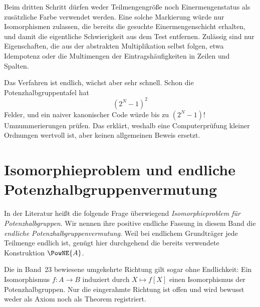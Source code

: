 \documentclass[main.tex]{subfiles}
\begin{document}
\begin{remark}
Beim dritten Schritt dürfen weder Teilmengengröße noch Einermengenstatus als
zusätzliche Farbe verwendet werden.  Eine solche Markierung würde nur
Isomorphismen zulassen, die bereits die gesuchte Einermengenschicht erhalten,
und damit die eigentliche Schwierigkeit aus dem Test entfernen.  Zulässig
sind nur Eigenschaften, die aus der abstrakten Multiplikation selbst folgen,
etwa Idempotenz oder die Multimengen der Eintragshäufigkeiten in Zeilen und
Spalten.
\end{remark}

Das Verfahren ist endlich, wächst aber sehr schnell.  Schon die
Potenzhalbgruppentafel hat
\[
  (2^N-1)^2
\]
Felder, und ein naiver kanonischer Code würde bis zu
\((2^N-1)!\) Umnummerierungen prüfen.  Das erklärt, weshalb eine
Computerprüfung kleiner Ordnungen wertvoll ist, aber keinen allgemeinen
Beweis ersetzt.

\section{Isomorphieproblem und endliche Potenzhalbgruppenvermutung}

In der Literatur heißt die folgende Frage überwiegend
\emph{Isomorphieproblem für Potenzhalbgruppen}.  Wir nennen ihre positive
endliche Fassung in diesem Band die \emph{endliche
Potenzhalbgruppenvermutung}.  Weil bei endlichem Grundträger jede Teilmenge
endlich ist, genügt hier durchgehend die bereits verwendete Konstruktion
\(\PowNE{A}\).

\begin{samepage}
\begin{center}
\end{center}
\end{samepage}

Die in Band~23 bewiesene umgekehrte Richtung gilt sogar ohne Endlichkeit:
Ein Isomorphismus \(f\colon A\to B\) induziert durch \(X\mapsto f[X]\) einen
Isomorphismus der Potenzhalbgruppen.  Nur die eingerahmte Richtung ist offen
und wird bewusst weder als Axiom noch als Theorem registriert.
\end{document}
